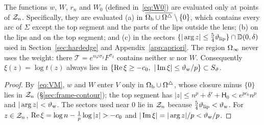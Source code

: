 \begin{lemma}\label{lem:weightdomain}
The functions $w$, $W$, $r_n$ and $W_0$ (defined in~\eqref{eq:W0}) are evaluated only at points of $\mathcal{Z}_n$.
Specifically, they are evaluated (a) in $\overline{\Omega_{\mathrm{b}}\cup\Omega^{\triangle}}\setminus\{0\}$, which contains every arc of $\Sigma$
except the top segment and the parts of the lips outside the lens; (b) on the lips and on the top segment; and (c) in
the sectors $\{|\arg z|\le\frac54\vartheta_{\mathrm{lip}}\}\cap \mathbb D(0,\delta)$ used in Section~\ref{sec:hardedge} and
Appendix~\ref{app:apriori}. The region $\Omega_{\infty}$ never uses the weight: there $\mathcal T=e^{n\varphi\sigma_3}F^{\sigma_3}$
contains neither $w$ nor $W$. Consequently $\xi(z)=\log t(z)$ always lies in
$\{\re\xi\ge-c_0,\ |\im\xi|\le\thw/p\}\subset S_\vartheta$.
\end{lemma}

\begin{proof}
By~\eqref{eq:VM}, $w$ and $W$ enter $V$ only in $\Omega_{\mathrm{b}}\cup\Omega^{\triangle}$, whose closure minus $\{0\}$ lies in $\mathcal{Z}_n$
(\S\ref{sec:frame-contour}); the top segment has $|z|\le n^p+\delta'+\mathsf H_0<e^{pc_0}n^p$ and $|\arg z|<\vartheta_{\mathrm{w}}$. The
sectors used near $0$ lie in $\mathcal{Z}_n$ because $\frac54\vartheta_{\mathrm{lip}}<\vartheta_{\mathrm{w}}$. For $z\in\mathcal{Z}_n$, $\re\xi=\log n-\frac1p\log|z|>-c_0$
and $|\operatorname{Im}\xi|=|\arg z|/p<\vartheta_{\mathrm{w}}/p$.
\end{proof}

